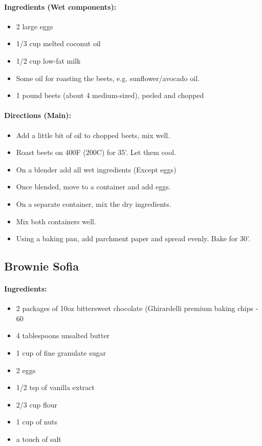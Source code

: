 \documentclass{article}
\begin{document}
\paragraph{Ingredients (Wet components):}
\begin{itemize}
    \item 2 large eggs
    \item 1/3 cup melted coconut oil
    \item 1/2 cup low-fat milk
    \item Some oil for roasting the beets, e.g. sunflower/avocado oil.
    \item 1 pound beets (about 4 medium-sized), peeled and chopped
\end{itemize}  

\paragraph{Directions (Main):}
\begin{itemize}
    \item Add a little bit of oil to chopped beets, mix well.
    \item Roast beets on 400F (200C) for 35'. Let them cool.
    \item On a blender add all wet ingredients (Except eggs)
    \item Once blended, move to a container and add eggs.
    \item On a separate container, mix the dry ingredients.
    \item Mix both containers well.
    \item Using a baking pan, add parchment paper and spread evenly. Bake for 30'.
\end{itemize} 

\subsection{Brownie Sofia}

\paragraph{Ingredients:}
\begin{itemize}
    \item 2 packages of 10oz bittersweet chocolate (Ghirardelli premium baking chips - 60%
    \item 4 tablespoons unsalted butter
    \item 1 cup of fine granulate sugar
    \item 2 eggs
    \item 1/2 tsp of vanilla extract
    \item 2/3 cup flour
    \item 1 cup of nuts
    \item a touch of salt
\end{itemize}
\end{document}
